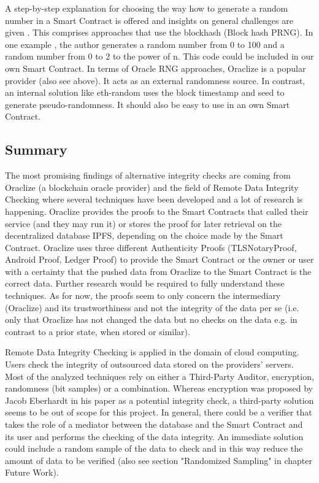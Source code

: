 A step-by-step explanation for choosing the way how to generate a random number in a Smart Contract is offered and insights on general challenges are given \cite{relatedWork25}. This comprises approaches that use the blockhash (Block hash PRNG).
In one example \cite{relatedWork26}, the author generates a random number from 0 to 100 and a random number from 0 to 2 to the power of n. This code could be included in our own Smart Contract.
In terms of Oracle RNG approaches, Oraclize \cite{relatedWork07} is a popular provider (also see above). It acts as an external randomness source.
In contrast, an internal solution like eth-random \cite{relatedWork27} uses the block timestamp and seed to generate pseudo-randomness. It should also be easy to use in an own Smart Contract.

\subsection{Summary}
The most promising findings of alternative integrity checks are coming from Oraclize (a blockchain oracle provider) and the field of Remote Data Integrity Checking where several techniques have been developed and a lot of research is happening.
Oraclize provides the proofs to the Smart Contracts that called their service (and they may run it) or stores the proof for later retrieval on the decentralized database IPFS, depending on the choice made by the Smart Contract. Oraclize uses three different Authenticity Proofs (TLSNotaryProof, Android Proof, Ledger Proof) to provide the Smart Contract or the owner or user with a certainty that the pushed data from Oraclize to the Smart Contract is the correct data. Further research would be required to fully understand these techniques. As for now, the proofs seem to only concern the intermediary (Oraclize) and its trustworthiness and not the integrity of the data per se (i.e. only that Oraclize has not changed the data but no checks on the data e.g. in contrast to a prior state, when stored or similar).

Remote Data Integrity Checking is applied in the domain of cloud computing. Users check the integrity of outsourced data stored on the providers’ servers. Most of the analyzed techniques rely on either a Third-Party Auditor, encryption, randomness (bit samples) or a combination. Whereas encryption was proposed by Jacob Eberhardt in his paper as a potential integrity check, a third-party solution seems to be out of scope for this project. In general, there could be a verifier that takes the role of a mediator between the database and the Smart Contract and its user and performs the checking of the data integrity. An immediate solution could include a random sample of the data to check and in this way reduce the amount of data to be verified (also see section "Randomized Sampling" in chapter Future Work).

